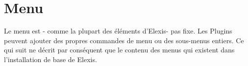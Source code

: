 

\section{Menu}
Le menu est - comme la plupart des éléments d'Elexis- pas fixe. Les Plugins peuvent ajouter des propres commandes de menu ou des sous-menus entiers. Ce qui suit ne décrit par conséquent que le contenu des menus qui existent dans l'installation de base de Elexis.

